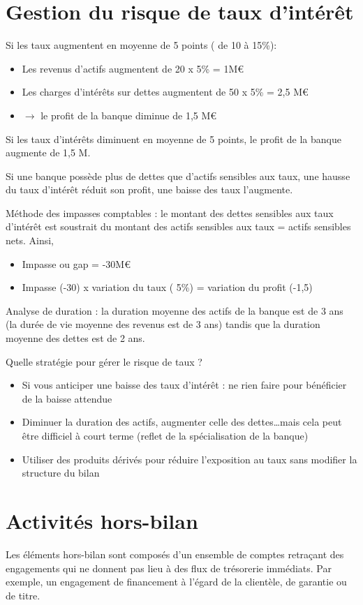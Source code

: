 \section{Gestion du risque de taux d'intérêt}

Si les taux augmentent en moyenne de 5 points ( de 10 à 15\%): 
\begin{itemize}
	\item Les revenus d'actifs augmentent de 20 x 5\% = 1M\euro
	\item Les charges d'intérêts sur dettes augmentent de 50 x 5\% = 2,5 M\euro
	\item $\rightarrow$ le profit de la banque diminue de 1,5 M\euro 
\end{itemize}


Si les taux d'intérêts diminuent en moyenne de 5 points, le profit de la banque augmente de 1,5 M.

Si une banque possède plus de dettes que d'actifs sensibles aux taux, une hausse du taux d'intérêt réduit son profit, une baisse des taux l'augmente.


Méthode des impasses comptables  : le montant des dettes sensibles aux taux d'intérêt est soustrait du montant des actifs sensibles aux taux = actifs sensibles nets. Ainsi,

\begin{itemize}
	\item Impasse ou gap = -30M\euro
	\item Impasse (-30) x variation du taux ( 5\%) = variation du profit (-1,5) 
\end{itemize}

Analyse de duration : la duration moyenne des actifs de la banque est de 3 ans (la durée de vie moyenne des revenus est de 3 ans) tandis que la duration moyenne des dettes est de 2 ans.
	
Quelle stratégie pour gérer le risque de taux ? 
\begin{itemize}
	\item Si vous anticiper une baisse des taux d’intérêt : ne rien faire pour bénéficier de la baisse attendue 
	\item Diminuer la duration des actifs, augmenter celle des dettes…mais cela peut être difficiel à court terme (reflet de la spécialisation de la banque) 
	\item Utiliser des produits dérivés pour réduire l'exposition au taux sans modifier la structure du bilan
\end{itemize}

\section{Activités hors-bilan}

Les éléments hors-bilan sont composés d'un ensemble de comptes retraçant des engagements qui ne donnent pas lieu à des flux de trésorerie immédiats. Par exemple, un engagement de financement à l'égard de la clientèle, de garantie ou de titre.